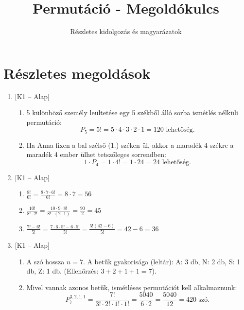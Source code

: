 \documentclass[12pt,a4paper]{article}
\title{Permutáció - Megoldókulcs}
\author{Részletes kidolgozás és magyarázatok}
\date{}
\begin{document}
\maketitle

\section*{Részletes megoldások}

\begin{enumerate}[label=\arabic*., leftmargin=*]

    \item \textsf{\small [K1 – Alap]}
    \begin{enumerate}[label=\alph*)]
        \item 5 különböző személy leültetése egy 5 székből álló sorba ismétlés nélküli permutáció:
        \[
        P_5 = 5! = 5 \cdot 4 \cdot 3 \cdot 2 \cdot 1 = 120 \text{ lehetőség.}
        \]
        \item Ha Anna fixen a bal szélső (1.) széken ül, akkor a maradék 4 székre a maradék 4 ember ülhet tetszőleges sorrendben:
        \[
        1 \cdot P_4 = 1 \cdot 4! = 1 \cdot 24 = 24 \text{ lehetőség.}
        \]
    \end{enumerate}

    \vspace{0.3cm}

    \item \textsf{\small [K1 – Alap]}
    \begin{enumerate}[label=\alph*)]
        \item $\displaystyle \frac{8!}{6!} = \frac{8 \cdot 7 \cdot 6!}{6!} = 8 \cdot 7 = 56$
        \item $\displaystyle \frac{10!}{8! \cdot 2!} = \frac{10 \cdot 9 \cdot 8!}{8! \cdot (2 \cdot 1)} = \frac{90}{2} = 45$
        \item $\displaystyle \frac{7! - 6!}{5!} = \frac{7 \cdot 6 \cdot 5! - 6 \cdot 5!}{5!} = \frac{5!(42 - 6)}{5!} = 42 - 6 = 36$
    \end{enumerate}

    \vspace{0.3cm}

    \item \textsf{\small [K1 – Alap]}
    \begin{enumerate}[label=\alph*)]
        \item A szó hossza $n = 7$. A betűk gyakorisága (leltár): 
        A: 3 db, N: 2 db, S: 1 db, Z: 1 db. (Ellenőrzés: $3 + 2 + 1 + 1 = 7$).
        \item Mivel vannak azonos betűk, ismétléses permutációt kell alkalmaznunk:
        \[
        P_7^{3, 2, 1, 1} = \frac{7!}{3! \cdot 2! \cdot 1! \cdot 1!} = \frac{5040}{6 \cdot 2} = \frac{5040}{12} = 420 \text{ szó.}
        \]
    \end{enumerate}


\end{enumerate}
\end{document}
